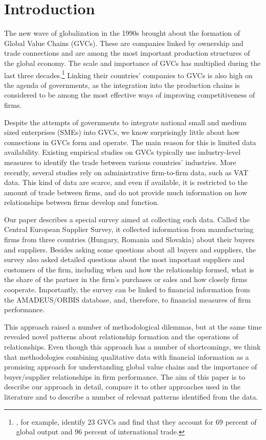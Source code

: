 \usepackage{}\documentclass[final, dvipsnames, authoryear,12pt]{elsarticle}
\begin{document}
\section{Introduction}

The new wave of globalization in the 1990s brought about the formation of Global Value Chains (GVCs). These are companies linked by ownership and trade connections and are among the most important production structures of the global economy. The scale and importance of GVCs has multiplied during the last three decades.\footnote{\cite{mckinsey2019gvc}, for example, identify 23 GVCs and find that they account for 69 percent of global output and 96 percent of international trade.} Linking their countries' companies to GVCs is also high on the agenda of governments, as the integration into the production chains is considered to be among the most effective ways of improving competitiveness of firms.

Despite the attempts of governments to integrate national small and medium sized enterprises (SMEs) into GVCs, we know surprisingly little about how connections in GVCs form and operate. The main reason for this is limited data availability. Existing empirical studies on GVCs typically use industry-level measures to identify the trade between various countries' industries. More recently, several studies rely on administrative firm-to-firm data, such as VAT data. This kind of data are scarce, and even if available, it is restricted to the amount of trade between firms, and do not provide much information on how relationships between firms develop and function. 

Our paper describes a special survey aimed at collecting such data.  Called the Central European Supplier Survey, it  collected information from manufacturing firms from three countries (Hungary, Romania and Slovakia) about their buyers and suppliers. Besides asking some questions about all buyers and suppliers, the survey also asked detailed questions about the most important suppliers and customers of the firm, including when and how the relationship formed, what is the share of the partner in the firm's purchases or sales and how closely firms cooperate. Importantly, the survey can be linked to financial information from the AMADEUS/ORBIS database, and, therefore, to financial measures of firm performance. 

This approach raised a number of methodological dilemmas, but at the same time revealed novel patterns about relationship formation and the operations of relationships. Even though this approach has a number of shortcomings, we think that methodologies combining qualitative data with financial information as a promising approach for understanding global value chains and the importance of buyer/supplier relationships in firm performance. The aim of this paper is to describe our approach in detail, compare it to other approaches used in the literature and to describe a number of relevant patterns identified from the data. 
\end{document}
